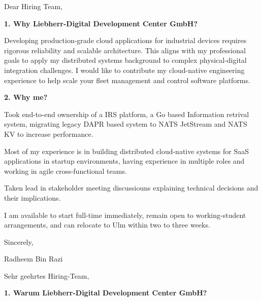 \documentclass[11pt,a4paper]{coverletter}
\begin{document}

\opening{Dear Hiring Team,}

\vspace{8pt}\noindent\textbf{1. Why Liebherr-Digital Development Center GmbH?}\par\vspace{3pt}

Developing production-grade cloud applications for industrial devices requires rigorous reliability and scalable architecture. This aligns with my professional goals to apply my distributed systems background to complex physical-digital integration challenges. I would like to contribute my cloud-native engineering experience to help scale your fleet management and control software platforms.

\vspace{8pt}\noindent\textbf{2. Why me?}\par\vspace{3pt}

\bullets

  \item Took end-to-end ownership of a IRS platform, a Go based Information retrival system, migrating legacy DAPR based system to NATS JetStream and NATS KV to increase performance.

  \item Most of my experience is in building distributed cloud-native systems for SaaS applications in startup environments, having experience in multiple roles and working in agile cross-functional teams.

  \item Taken lead in stakeholder meeting discussiouns explaining technical decisions and their implications.

\bulletsend

I am available to start full-time immediately, remain open to working-student arrangements, and can relocate to Ulm within two to three weeks.

\closing{Sincerely,}{Radheem Bin Razi}

\clearpage
{}


\opening{Sehr geehrtes Hiring-Team,}

\vspace{8pt}\noindent\textbf{1. Warum Liebherr-Digital Development Center GmbH?}\par\vspace{3pt}
\end{document}
